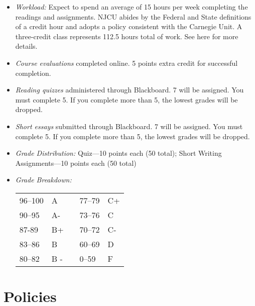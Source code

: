 \documentclass[article,oneside]{memoir}
\begin{document}
\begin{itemize}
\item \textit{Workload:} Expect to spend an average of 15 hours per week  completing the readings and assignments. NJCU abides by the Federal and State definitions of a credit hour and adopts a policy consistent with the Carnegie Unit. A three-credit class represents 112.5 hours total of work. See here for more details.

\item \textit{Course evaluations} completed online. 5 points extra credit for successful completion.

\item \textit{Reading quizzes} administered through Blackboard. 7 will be assigned. You must complete 5. If you complete more than 5, the lowest grades will be dropped. 

\item \textit{Short essays} submitted through Blackboard. 7 will be assigned. You must complete 5. If you complete more than 5, the lowest grades will be dropped. 

 
\item \textit{Grade Distribution:} Quiz---10 points each (50 total);  Short Writing Assignments---10 points each (50 total)


\item \textit{Grade Breakdown:}

 \begin{tabular}{ | l | l | p{2cm} | l | l | }
    \hline 
96--100 & A  & &  77--79 &  C+ \\  
90--95 & A- & &  73--76 & C \\
87-89 & B+ &  &  70--72 & C- \\ 
83--86 & B  & &  60--69 & D\\
80--82 & B - & & 0--59 & F\\ \hline
    \end{tabular}


\end{itemize}


\section{Policies}
\end{document}
